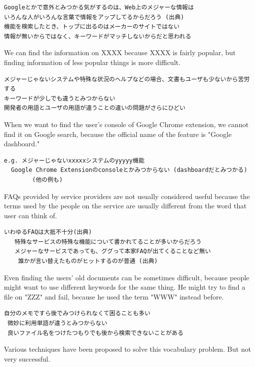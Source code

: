 \documentclass[manuscript,screen,review]{acmart}
\begin{document}
\begin{verbatim}
Googleとかで意外とみつかる気がするのは、Web上のメジャーな情報は
いろんな人がいろんな言葉で情報をアップしてるからだろう (出典)
機能を検索したとき、トップに出るのはメーカーのサイトではない
情報が無いからではなく、キーワードがマッチしないからだと思われる
\end{verbatim}

We can find the information on XXXX because XXXX is fairly popular, but finding information of less popular things is more difficult.

\begin{verbatim}
メジャーじゃないシステムや特殊な状況のヘルプなどの場合、文書もユーザも少ないから苦労する
キーワードが少しでも違うとみつからない
開発者の用語とユーザの用語が違うことの違いの問題がさらにひどい
\end{verbatim}

When we want to find the user's console of Google Chrome extension, we
cannot find it on Google search, because the official name of the
feature is "Google dashboard."

\begin{verbatim}
e.g. メジャーじゃないxxxxxシステムのyyyyy機能
  Google Chrome Extensionのconsoleとかみつからない (dashboardだとみつかる)
		(他の例も)
\end{verbatim}

FAQs provided by service providers are not usually considered useful
because the terms used by the people on the service are usually
different from the word that user can think of.

\begin{verbatim}
いわゆるFAQは大抵不十分(出典)
   特殊なサービスの特殊な機能について書かれてることが多いからだろう
   メジャーなサービスであっても、ググって本家FAQが出てくることなど無い
    誰かが言い替えたものがヒットするのが普通 (出典)
\end{verbatim}

Even finding the users' old documents can be sometimes difficult,
because people might want to use different keywords for the same
thing. He might try to find a file on "ZZZ" and fail, because he used
the term "WWW" instead before.

\begin{verbatim}
自分のメモですら後でみつけられなくて困ることも多い
 微妙に利用単語が違うとみつからない
 良いファイル名をつけたつもりでも後から検索できないことがある
\end{verbatim}

Various techniques have been proposed to solve this vocabulary problem.
But not very successful.
\end{document}
